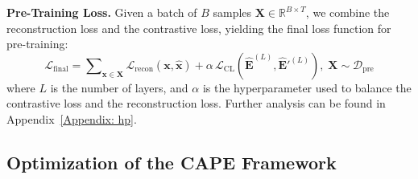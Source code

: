 {%


\textbf{Pre-Training Loss.} Given a batch of $B$ samples $\mathbf{X} \in \mathbb{R}^{B \times T}$, we combine the reconstruction loss and the contrastive loss, yielding the final loss function for pre-training: 
{\small
\begin{equation}
\mathcal{L}_{\text{final}} = \sum\nolimits_{\mathbf{x} \in \mathbf{X}}\mathcal{L}_{\text{recon}}(\mathbf{x}, \hat{\mathbf{x}}) + \alpha \, \mathcal{L}_{\text{CL}}(\hat{\mathbf{E}}^{(L)}, \hat{\mathbf{E}}'^{(L)}), \; \mathbf{X} \sim \mathcal{D}_\text{pre}  \nonumber
\end{equation}}where $L$ is the number of layers, and $\alpha$ is the hyperparameter used to balance the contrastive loss and the reconstruction loss. Further analysis can be found in Appendix~\ref{Appendix: hp}.


\subsection{Optimization of the CAPE Framework}
\label{sec: EM}

}
